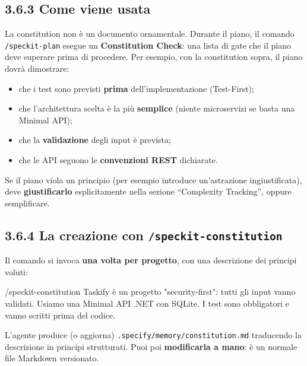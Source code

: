 \documentclass[
  italian,
  10pt,
]{book}
\newenvironment{Shaded}{\begin{snugshade}}{\end{snugshade}}
\newcommand{\NormalTok}[1]{#1}
\providecommand{\tightlist}{%
  \setlength{\itemsep}{0pt}\setlength{\parskip}{0pt}}
\begin{document}
\subsection{3.6.3 Come viene usata}\label{come-viene-usata}

La constitution non è un documento ornamentale. Durante il piano, il
comando \texttt{/speckit-plan} esegue un \textbf{Constitution Check}:
una lista di gate che il piano deve superare prima di procedere. Per
esempio, con la constitution sopra, il piano dovrà dimostrare:

\begin{itemize}
\tightlist
\item
  che i test sono previsti \textbf{prima} dell'implementazione
  (Test-First);
\item
  che l'architettura scelta è la più \textbf{semplice} (niente
  microservizi se basta una Minimal API);
\item
  che la \textbf{validazione} degli input è prevista;
\item
  che le API seguono le \textbf{convenzioni REST} dichiarate.
\end{itemize}

Se il piano viola un principio (per esempio introduce un'astrazione
ingiustificata), deve \textbf{giustificarlo} esplicitamente nella
sezione ``Complexity Tracking'', oppure semplificare.

\subsection{\texorpdfstring{3.6.4 La creazione con
\texttt{/speckit-constitution}}{3.6.4 La creazione con /speckit-constitution}}\label{la-creazione-con-speckit-constitution}

Il comando si invoca \textbf{una volta per progetto}, con una
descrizione dei principi voluti:

\begin{Shaded}
\begin{Highlighting}[]
\NormalTok{/speckit{-}constitution Taskify è un progetto "security{-}first": tutti gli input}
\NormalTok{vanno validati. Usiamo una Minimal API .NET con SQLite. I test sono obbligatori}
\NormalTok{e vanno scritti prima del codice.}
\end{Highlighting}
\end{Shaded}

L'agente produce (o aggiorna) \texttt{.specify/memory/constitution.md}
traducendo la descrizione in principi strutturati. Puoi poi
\textbf{modificarla a mano}: è un normale file Markdown versionato.
\end{document}
